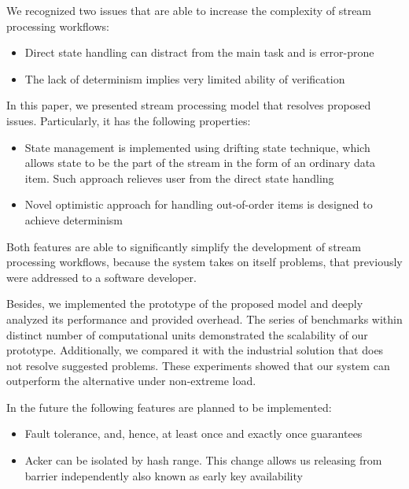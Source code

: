 
\label {fs-conclusions}

We recognized two issues that are able to increase the complexity of stream processing workflows:

\begin{itemize}
    \item Direct state handling can distract from the main task and is error-prone 
    \item The lack of determinism implies very limited ability of verification
\end{itemize}

In this paper, we presented stream processing model that resolves proposed issues. Particularly, it has the following properties:

\begin{itemize}
    \item State management is implemented using drifting state technique, which allows state to be the part of the stream in the form of an ordinary data item. Such approach relieves user from the direct state handling
    \item Novel optimistic approach for handling out-of-order items is designed to achieve determinism
\end{itemize}

Both features are able to significantly simplify the development of stream processing workflows, because the system takes on itself problems, that previously were addressed to a software developer.

Besides, we implemented the prototype of the proposed model and deeply analyzed its performance and provided overhead. The series of benchmarks within distinct number of computational units demonstrated the scalability of our prototype. Additionally, we compared it with the industrial solution that does not resolve suggested problems. These experiments showed that our system can outperform the alternative under non-extreme load.

In the future the following features are planned to be implemented:
\begin{itemize}
    \item Fault tolerance, and, hence, at least once and exactly once guarantees
    \item Acker can be isolated by hash range. This change allows us releasing from barrier independently also known as early key availability
\end{itemize}
